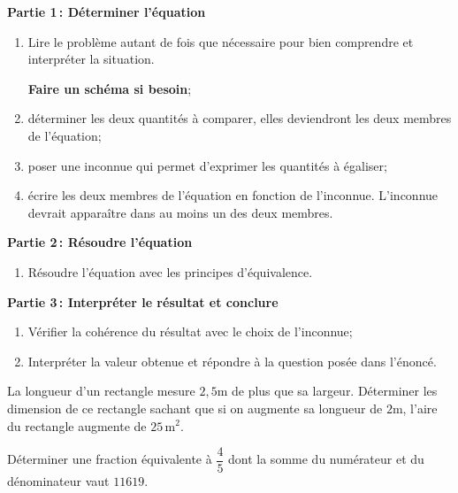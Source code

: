 \documentclass[a4paper,12pt]{article}
\begin{document}
{\bfseries Partie 1\,: Déterminer l'équation}
\begin{enumerate}[1)]
	\item Lire le problème autant de fois que nécessaire pour bien comprendre et interpréter la situation.

		{\bfseries Faire un schéma si besoin};
	\item déterminer les deux quantités à comparer, elles deviendront les deux membres de l'équation;
	\item poser une inconnue qui permet d'exprimer les quantités à égaliser;
	\item écrire les deux membres de l'équation en fonction de l'inconnue. L'inconnue devrait apparaître dans au moins un des deux membres.
\end{enumerate}
{\bfseries Partie 2\,: Résoudre l'équation}
\begin{enumerate}[1),resume]
	\item Résoudre l'équation avec les principes d'équivalence.
\end{enumerate}
{\bfseries Partie 3\,: Interpréter le résultat et conclure}
\begin{enumerate}[1),resume]
	\item Vérifier la cohérence du résultat avec le choix de l'inconnue;
	\item Interpréter la valeur obtenue et répondre à la question posée dans l'énoncé.
\end{enumerate}
\begin{exemple}
	\tcblower
	La longueur d'un rectangle mesure $2{,}5$m de plus que sa largeur. Déterminer les dimension de ce rectangle sachant que si on augmente sa longueur de $2$m, l'aire du rectangle augmente de $25\,\text{m}^2$.	
\vspace{6.5cm}

\end{exemple}
\begin{exemple}
	\tcblower
Déterminer une fraction équivalente à $\dfrac{4}{5}$ dont la somme du numérateur et du dénominateur vaut $11619$. 
\vspace{4.5cm}

\end{exemple}
\newpage
\end{document}
